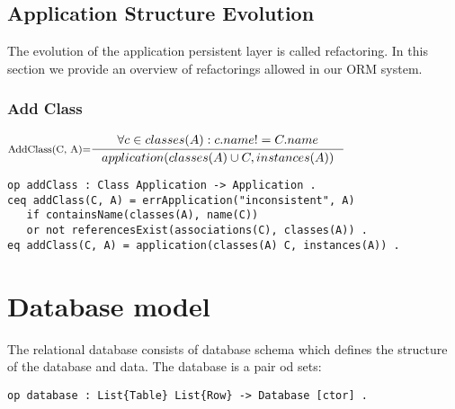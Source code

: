 \documentclass[11pt]{article}
\begin{document}
\subsection{Application Structure Evolution}
The evolution of the application persistent layer is called refactoring. In this section we provide an overview of refactorings allowed in our ORM system.

\subsubsection{Add Class}
$
\inference[AddClass(C, A)=]{\forall c \in classes(A) : c.name != C.name}
{application(classes(A) \cup C, instances(A))}
$

\begin{verbatim}
op addClass : Class Application -> Application .
ceq addClass(C, A) = errApplication("inconsistent", A) 
   if containsName(classes(A), name(C))  
   or not referencesExist(associations(C), classes(A)) .
eq addClass(C, A) = application(classes(A) C, instances(A)) .
\end{verbatim}



\section{Database model}
The relational database consists of database schema which defines the structure of the database and data. The database is a pair od sets:
\begin{verbatim}
op database : List{Table} List{Row} -> Database [ctor] .
\end{verbatim}
\end{document}
